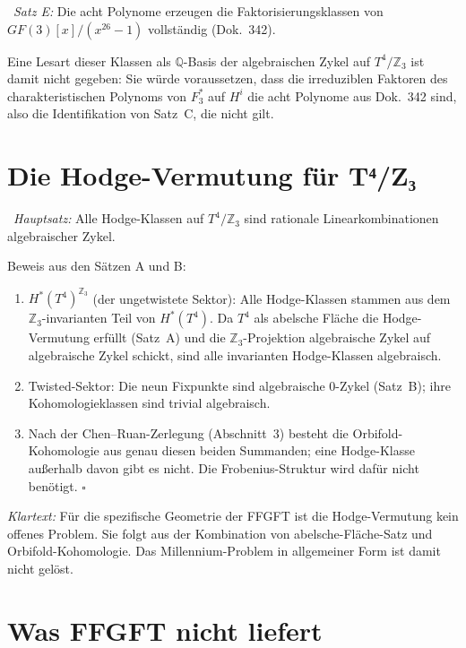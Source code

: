 \BM\ \textit{Satz E:} Die acht Polynome erzeugen die Faktorisierungsklassen
von $GF(3)[x]/(x^{26}-1)$ vollständig (Dok.~342).

Eine Lesart dieser Klassen als $\mathbb{Q}$-Basis der algebraischen Zykel
auf $T^4/\mathbb{Z}_3$ ist damit nicht gegeben: Sie würde voraussetzen, dass
die irreduziblen Faktoren des charakteristischen Polynoms von $F_3^*$ auf
$H^i$ die acht Polynome aus Dok.~342 sind, also die Identifikation von
Satz~C, die nicht gilt.

\section{Die Hodge-Vermutung für T⁴/Z₃}

\BM\ \textit{Hauptsatz:} Alle Hodge-Klassen auf $T^4/\mathbb{Z}_3$ sind
rationale Linearkombinationen algebraischer Zykel.

Beweis aus den Sätzen A und B:
\begin{enumerate}
\item $H^*(T^4)^{\mathbb{Z}_3}$ (der ungetwistete Sektor): Alle Hodge-Klassen
      stammen aus dem $\mathbb{Z}_3$-invarianten Teil von $H^*(T^4)$.
      Da $T^4$ als abelsche Fläche die Hodge-Vermutung erfüllt (Satz~A)
      und die $\mathbb{Z}_3$-Projektion algebraische Zykel auf algebraische
      Zykel schickt, sind alle invarianten Hodge-Klassen algebraisch.
\item Twisted-Sektor: Die neun Fixpunkte sind algebraische 0-Zykel (Satz~B);
      ihre Kohomologieklassen sind trivial algebraisch.
\item Nach der Chen--Ruan-Zerlegung (Abschnitt~3) besteht die
      Orbifold-Kohomologie aus genau diesen beiden Summanden; eine
      Hodge-Klasse außerhalb davon gibt es nicht. Die Frobenius-Struktur
      wird dafür nicht benötigt. \hfill$\square$
\end{enumerate}

\noindent\textit{Klartext:} Für die spezifische Geometrie der FFGFT ist die
Hodge-Vermutung kein offenes Problem. Sie folgt aus der Kombination von
abelsche-Fläche-Satz und Orbifold-Kohomologie. Das
Millennium-Problem in allgemeiner Form ist damit nicht gelöst.

\section{Was FFGFT nicht liefert}

